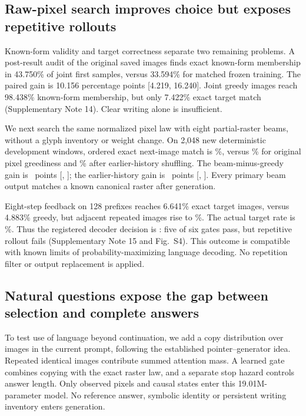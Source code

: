 \subsection*{Raw-pixel search improves choice but exposes repetitive rollouts}
Known-form validity and target correctness separate two remaining problems.
A post-result audit of the original saved images finds exact known-form
membership in 43.750\% of joint first samples, versus 33.594\% for matched
frozen training. The paired gain is 10.156 percentage points [4.219, 16.240].
Joint greedy images reach 98.438\% known-form membership, but only 7.422\%
exact target match (Supplementary Note 14). Clear writing alone is insufficient.

We next search the same normalized pixel law with eight partial-raster beams,
without a glyph inventory or weight change. On 2,048 new deterministic
development windows, ordered exact next-image match is \BeamAccuracy\%,
versus \GreedyAccuracy\% for original pixel greediness and \BeamShuffled\%
after earlier-history shuffling. The beam-minus-greedy gain is \BeamGain\
points [\BeamGainLow, \BeamGainHigh]; the earlier-history gain is
\BeamHistoryGain\ points [\BeamHistoryLow, \BeamHistoryHigh]. Every primary
beam output matches a known canonical raster after generation.

Eight-step feedback on 128 prefixes reaches 6.641\% exact target images,
versus 4.883\% greedy, but adjacent repeated images rise to \BeamRepeat\%.
The actual target rate is \TargetRepeat\%. Thus the registered decoder
decision is \texttt{\BeamDecision}: five of six gates pass, but repetitive
rollout fails (Supplementary Note 15 and Fig.~S4). This outcome is compatible
with known limits of probability-maximizing language decoding\cite{degeneration}.
No repetition filter or output replacement is applied.

\subsection*{Natural questions expose the gap between selection and complete answers}
To test use of language beyond continuation, we add a copy distribution over
images in the current prompt, following the established pointer--generator
idea\cite{pointer}. Repeated identical images contribute summed attention
mass. A learned gate combines copying with the exact raster law, and a
separate stop hazard controls answer length. Only observed pixels and causal
states enter this 19.01M-parameter model. No reference answer, symbolic
identity or persistent writing inventory enters generation.

